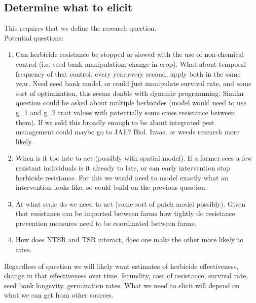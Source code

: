 \documentclass[12pt, a4paper]{article}
\begin{document}
\subsection{Determine what to elicit}
This requires that we define the research question. \\
Potential questions:\\
\begin{enumerate}
	\item Can herbicide resistance be stopped or slowed with the use of non-chemical control (i.e. seed bank manipulation, change in crop). What about temporal frequency of that control, every year,every second, apply both in the same year. Need seed bank model, or could just manipulate survival rate, and some sort of optimization, this seems doable with dynamic programming. Similar question could be asked about multiple herbicides (model would need to use g_1 and g_2 trait values with potentially some cross resistance between them). If we sold this broadly enough to be about integrated pest management could maybe go to JAE? Biol. Invas. or weeds research more likely.     
	\item When is it too late to act (possibly with spatial model). If a farmer sees a few resistant individuals is it already to late, or can early intervention stop herbicide resistance. For this we would need to model exactly what an intervention looks like, so could build on the previous question.  
	\item At what scale do we need to act (some sort of patch model possibly). Given that resistance can be imported between farms how tightly do resistance prevention measures need to be coordinated between farms.   
	\item How does NTSR and TSR interact, does one make the other more likely to arise.
\end{enumerate}

Regardless of question we will likely want estimates of herbicide effectiveness, change in that effectiveness over time, fecundity, cost of resistance, survival rate, seed bank longevity, germination rates. What we need to elicit will depend on what we can get from other sources. 
	
\end{document}
